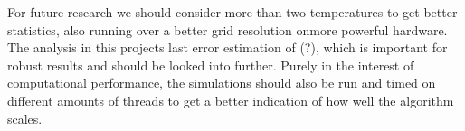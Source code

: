 \documentclass[twocolumn]{aastex62}
\begin{document}
For future research we should consider more than two temperatures
to get better statistics, also running over a better grid
resolution onmore powerful hardware. The analysis in this projects last error
estimation of (?), which is important for robust results and should be looked
into further. Purely in the interest of computational performance, the
simulations should also be run and timed on different amounts of threads
to get a better indication of how well the algorithm scales.


\newpage


\end{document}
